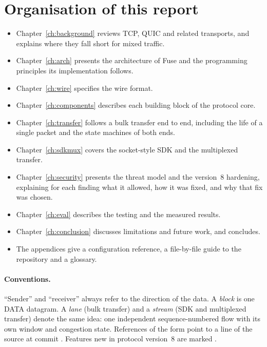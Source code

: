 \section{Organisation of this report}

\begin{itemize}
  \item Chapter~\ref{ch:background} reviews TCP, QUIC and related transports, and explains where they fall short
    for mixed traffic.
  \item Chapter~\ref{ch:arch} presents the architecture of Fuse and the programming principles its
    implementation follows.
  \item Chapter~\ref{ch:wire} specifies the wire format.
  \item Chapter~\ref{ch:components} describes each building block of the protocol core.
  \item Chapter~\ref{ch:transfer} follows a bulk transfer end to end, including the life of a single packet and
    the state machines of both ends.
  \item Chapter~\ref{ch:sdkmux} covers the socket-style SDK and the multiplexed transfer.
  \item Chapter~\ref{ch:security} presents the threat model and the version~8 hardening, explaining for each
    finding what it allowed, how it was fixed, and why that fix was chosen.
  \item Chapter~\ref{ch:eval} describes the testing and the measured results.
  \item Chapter~\ref{ch:conclusion} discusses limitations and future work, and concludes.
  \item The appendices give a configuration reference, a file-by-file guide to the repository and a glossary.
\end{itemize}

\paragraph{Conventions.} ``Sender'' and ``receiver'' always refer to the direction of the data. A
\emph{block} is one DATA datagram. A \emph{lane} (bulk transfer) and a \emph{stream} (SDK and multiplexed
transfer) denote the same idea: one independent sequence-numbered flow with its own window and congestion state.
References of the form  point to a line of the source at commit . Features new
in protocol version~8 are marked \vviii.
